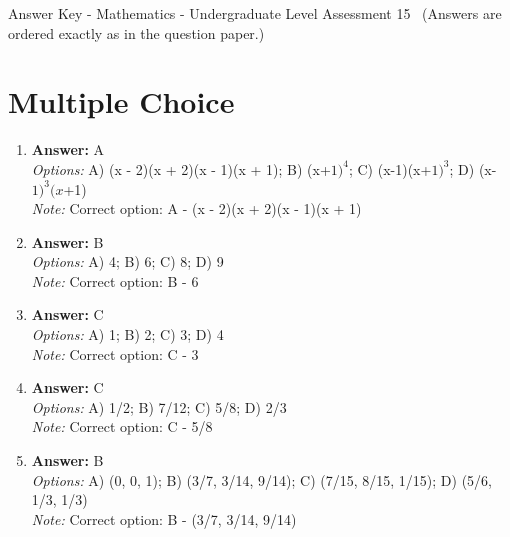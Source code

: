\documentclass[12pt]{article}
\begin{document}
\begin{center}
Answer Key - Mathematics - Undergraduate Level Assessment 15 \
\small (Answers are ordered exactly as in the question paper.)
\end{center}

\section*{Multiple Choice}
\begin{enumerate}[label=\arabic*.]
\item \textbf{Answer:} A
\\ \textit{Options:} A) (x - 2)(x + 2)(x - 1)(x + 1); B) (x+$1)^4$; C) (x-1)(x+$1)^3$; D) (x-$1)^3(x$+1)
\\ \textit{Note:} Correct option: A - (x - 2)(x + 2)(x - 1)(x + 1)
\item \textbf{Answer:} B
\\ \textit{Options:} A) 4; B) 6; C) 8; D) 9
\\ \textit{Note:} Correct option: B - 6
\item \textbf{Answer:} C
\\ \textit{Options:} A) 1; B) 2; C) 3; D) 4
\\ \textit{Note:} Correct option: C - 3
\item \textbf{Answer:} C
\\ \textit{Options:} A) 1/2; B) 7/12; C) 5/8; D) 2/3
\\ \textit{Note:} Correct option: C - 5/8
\item \textbf{Answer:} B
\\ \textit{Options:} A) (0, 0, 1); B) (3/7, 3/14, 9/14); C) (7/15, 8/15, 1/15); D) (5/6, 1/3, 1/3)
\\ \textit{Note:} Correct option: B - (3/7, 3/14, 9/14)
\end{enumerate}
\end{document}
